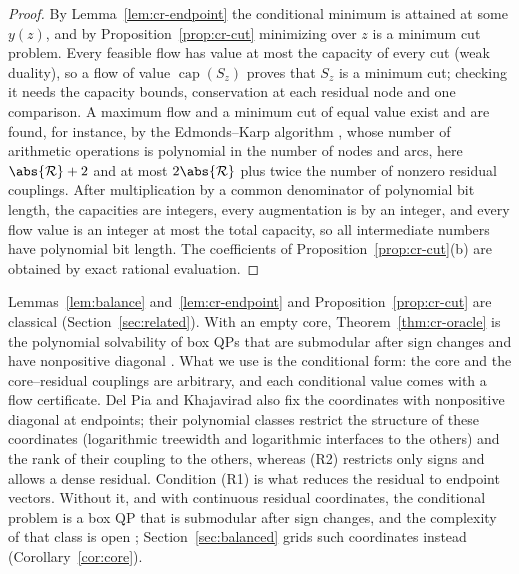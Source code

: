 \begin{proof}
By Lemma~\ref{lem:cr-endpoint} the conditional minimum is attained at some
$y(z)$, and by Proposition~\ref{prop:cr-cut} minimizing over $z$ is a
minimum cut problem. Every feasible flow has value at most the capacity of
every cut (weak duality), so a flow of value $\operatorname{cap}(S_z)$
proves that $S_z$ is a minimum cut; checking it needs the capacity bounds,
conservation at each residual node and one comparison. A maximum flow and a
minimum cut of equal value exist and are found, for instance, by the
Edmonds--Karp algorithm \cite{EdmondsKarp1972}, whose number of arithmetic
operations is polynomial in the number of nodes and arcs, here
$\abs{\mathcal R}+2$ and at most $2\abs{\mathcal R}$ plus twice the number
of nonzero residual couplings. After multiplication by a common denominator
of polynomial bit length, the capacities are integers, every augmentation is
by an integer, and every flow value is an integer at most the total
capacity, so all intermediate numbers have polynomial bit length. The
coefficients of Proposition~\ref{prop:cr-cut}(b) are obtained by exact
rational evaluation.
\end{proof}

\begin{remark}\label{rem:cr-cut-prior}
Lemmas~\ref{lem:balance} and~\ref{lem:cr-endpoint} and
Proposition~\ref{prop:cr-cut} are classical (Section~\ref{sec:related}).
With an empty core, Theorem~\ref{thm:cr-oracle} is the polynomial
solvability of box QPs that are submodular after sign changes and have
nonpositive diagonal \cite{Padberg1989,BurerNatarajanWillemsen2026v3}. What
we use is the conditional form: the core and the core--residual couplings
are arbitrary, and each conditional value comes with a flow certificate.
Del Pia and Khajavirad also fix the coordinates with nonpositive diagonal at
endpoints; their polynomial classes \cite[Theorem~4]{DelPiaKhajavirad2026}
restrict the structure of these coordinates (logarithmic treewidth and
logarithmic interfaces to the others) and the rank of their coupling to the
others, whereas (R2) restricts only signs and allows a dense residual.
Condition (R1) is what reduces the residual to endpoint vectors. Without it,
and with continuous residual coordinates, the conditional problem is a box
QP that is submodular after sign changes, and the complexity of that class
is open \cite[footnote~2]{BurerNatarajanWillemsen2026v3};
Section~\ref{sec:balanced} grids such coordinates instead
(Corollary~\ref{cor:core}).
\end{remark}

